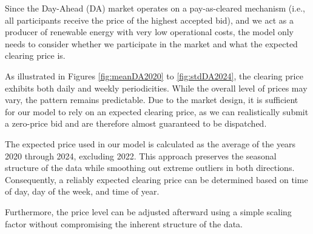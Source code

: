 Since the Day-Ahead (DA) market operates on a pay-as-cleared mechanism
(i.e., all participants receive the price of the highest accepted bid),
and we act as a producer of renewable energy with very low operational costs,
the model only needs to consider whether we participate in the market
and what the expected clearing price is.

As illustrated in Figures \ref{fig:meanDA2020} to \ref{fig:stdDA2024},
the clearing price exhibits both daily and weekly periodicities.
While the overall level of prices may vary, the pattern remains predictable.
Due to the market design, it is sufficient for our model to rely
on an expected clearing price, as we can realistically submit
a zero-price bid and are therefore almost guaranteed to be dispatched.

The expected price used in our model is calculated as the average
of the years 2020 through 2024, excluding 2022. This approach
preserves the seasonal structure of the data while smoothing out
extreme outliers in both directions. Consequently, a reliably
expected clearing price can be determined based on time of day,
day of the week, and time of year.

Furthermore, the price level can be adjusted afterward using
a simple scaling factor without compromising the inherent
structure of the data.


